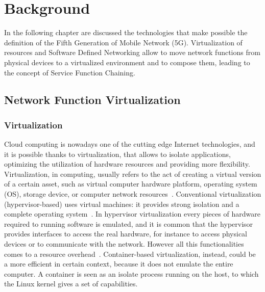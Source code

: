 \chapter{Background}
\label{chap:background}
In the following chapter are discussed the technologies that make possible the
definition of the Fifth Generation of Mobile Network (5G). Virtualization of
resources and Software Defined Networking allow to move network functions from
physical devices to a virtualized environment and to compose them, leading to
the concept of Service Function Chaining.

\section{Network Function Virtualization}

\subsection{Virtualization}
Cloud computing is nowadays one of the cutting edge Internet technologies, and
it is possible thanks to virtualization, that allows to isolate applications,
optimizing the utilization of hardware resources and providing more flexibility.
Virtualization, in computing, usually refers to the act of creating a virtual
version of a certain asset, such as virtual computer hardware platform,
operating system (OS), storage device, or computer network
resources~\cite{liu2014research}. Conventional virtualization
(hypervisor-based) uses virtual machines: it provides strong isolation and a
complete operating system~\cite{eder2016hypervisor}. In hypervisor
virtualization every pieces of hardware required to running software is
emulated, and it is common that the hypervisor provides interfaces to access
the real hardware, for instance to access physical devices or to communicate
with the network. However all this functionalities comes to a resource
overhead~\cite{scheepers2014virtualization}. Container-based virtualization,
instead, could be a more efficient in certain context, because it does not
emulate the entire computer. A container is seen as an isolate process running
on the host, to which the Linux kernel gives a set of capabilities.


